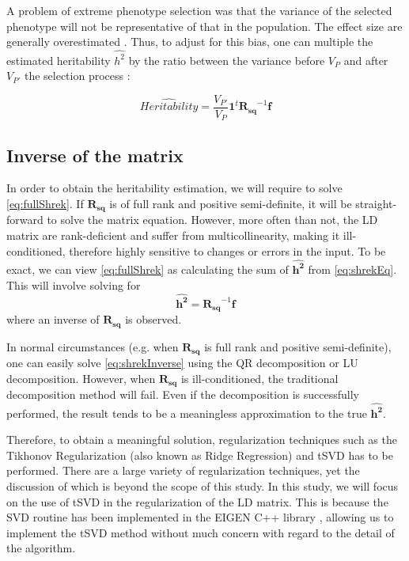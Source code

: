 			A problem of extreme phenotype selection was that the variance of the selected phenotype will not be representative of that in the population.
			The effect size are generally overestimated \citep{Guey2011}. 
			Thus, to adjust for this bias, one can multiple the estimated heritability $\hat{h^2}$ by the ratio between the variance before $V_P$ and after $V_{P'}$ the selection process \citep{Sham2014}:
			
			\begin{equation}
			\hat{Heritability} = \frac{V_{P'}}{V_P}\boldsymbol{1}^t\boldsymbol{R_{sq}}^{-1}\boldsymbol{f}
			\label{eq:extremeShrek}
			\end{equation}
			
		\subsection{Inverse of the  matrix}
			In order to obtain the heritability estimation, we will require to solve \cref{eq:fullShrek}. 
			If $\boldsymbol{R_{sq}}$ is of full rank and positive semi-definite, it will be straight-forward to solve the matrix equation.
			However, more often than not, the \gls{LD} matrix are rank-deficient and suffer from multicollinearity, making it ill-conditioned, therefore highly sensitive to changes or errors in the input.
			To be exact, we can view \cref{eq:fullShrek} as calculating the sum of $\boldsymbol{\hat{h^2}}$ from  \cref{eq:shrekEq}.
			This will involve solving for
			\begin{equation}
			\boldsymbol{\hat{h^2}} = \boldsymbol{R_{sq}}^{-1}\boldsymbol{f}
			\label{eq:shrekInverse}
			\end{equation}
			where an inverse of $\boldsymbol{R_{sq}}$ is observed. 
			
			In normal circumstances (e.g. when $\boldsymbol{R_{sq}}$ is full rank and positive semi-definite), one can easily solve \cref{eq:shrekInverse} using the QR decomposition or LU decomposition.
			However, when $\boldsymbol{R_{sq}}$ is ill-conditioned, the traditional decomposition method will fail.
			Even if the decomposition is successfully performed, the result tends to be a meaningless approximation to the true $\boldsymbol{\hat{h^2}}$. 
			
			Therefore, to obtain a meaningful solution, regularization techniques such as the Tikhonov Regularization (also known as Ridge Regression) and \gls{tSVD} has to be performed\citep{Neumaier1998}. 
			There are a large variety of regularization techniques, yet the discussion of which is beyond the scope of this study. 
			In this study, we will focus on the use of \gls{tSVD} in the regularization of the \gls{LD} matrix.
			This is because the \gls{SVD} routine has been implemented in the EIGEN C++ library \citep{eigenweb}, allowing us to implement the \gls{tSVD} method without much concern with regard to the detail of the algorithm. 
			
